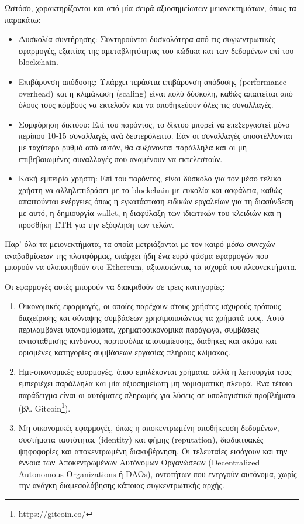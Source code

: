 Ωστόσο, χαρακτηρίζονται και από μία σειρά αξιοσημείωτων μειονεκτημάτων, όπως τα παρακάτω:
\begin{itemize}
	\item Δυσκολία συντήρησης: Συντηρούνται δυσκολότερα από τις συγκεντρωτικές εφαρμογές, εξαιτίας της αμεταβλητότητας του κώδικα και των δεδομένων επί του blockchain. 
	\item Επιβάρυνση απόδοσης: Υπάρχει τεράστια επιβάρυνση απόδοσης (performance overhead) και η κλιμάκωση (scaling) είναι πολύ δύσκολη, καθώς απαιτείται από όλους τους κόμβους να εκτελούν και να αποθηκεύουν όλες τις συναλλαγές.
	\item Συμφόρηση δικτύου: Επί του παρόντος, το δίκτυο μπορεί να επεξεργαστεί μόνο περίπου 10-15 συναλλαγές ανά δευτερόλεπτο. Εάν οι συναλλαγές αποστέλλονται με ταχύτερο ρυθμό από αυτόν, θα αυξάνονται παράλληλα και οι μη επιβεβαιωμένες συναλλαγές που αναμένουν να εκτελεστούν.
	\item Κακή εμπειρία χρήστη: Επί του παρόντος, είναι δύσκολο για τον μέσο τελικό χρήστη να αλληλεπιδράσει με το blockchain με ευκολία και ασφάλεια, καθώς απαιτούνται ενέργειες όπως η εγκατάσταση ειδικών εργαλείων για τη διασύνδεση με αυτό, η δημιουργία wallet, η διαφύλαξη των ιδιωτικών του κλειδιών και η προσθήκη ETH για την εξόφληση των τελών.
\end{itemize}

Παρ' όλα τα μειονεκτήματα, τα οποία μετριάζονται με τον καιρό μέσω συνεχών αναβαθμίσεων της πλατφόρμας, υπάρχει ήδη ένα ευρύ φάσμα εφαρμογών που μπορούν να υλοποιηθούν στο Ethereum, αξιοποιώντας τα ισχυρά του πλεονεκτήματα.

\newpage
Οι εφαρμογές αυτές μπορούν να διακριθούν σε τρεις κατηγορίες:

\begin{enumerate}
	\item Οικονομικές εφαρμογές, οι οποίες παρέχουν στους χρήστες ισχυρούς τρόπους διαχείρισης και σύναψης συμβάσεων χρησιμοποιώντας τα χρήματά τους. Αυτό περιλαμβάνει υπονομίσματα, χρηματοοικονομικά παράγωγα, συμβάσεις αντιστάθμισης κινδύνου, πορτοφόλια αποταμίευσης, διαθήκες και ακόμα και ορισμένες κατηγορίες συμβάσεων εργασίας πλήρους κλίμακας.
	
	\item Ημι-οικονομικές εφαρμογές, όπου εμπλέκονται χρήματα, αλλά η λειτουργία τους εμπεριέχει παράλληλα και μία αξιοσημείωτη μη νομισματική πλευρά. Ένα τέτοιο παράδειγμα είναι οι αυτόματες πληρωμές για λύσεις σε υπολογιστικά προβλήματα (βλ. Gitcoin\footnote{\url{https://gitcoin.co/}}).
	
	\item Μη οικονομικές εφαρμογές, όπως η αποκεντρωμένη αποθήκευση δεδομένων, συστήματα ταυτότητας (identity) και φήμης (reputation), διαδικτυακές ψηφοφορίες και αποκεντρωμένη διακυβέρνηση. Οι τελευταίες εισάγουν και την έννοια των Αποκεντρωμένων Αυτόνομων Οργανώσεων (Decentralized Autonomous Organizations ή DAOs), οντοτήτων που ενεργούν αυτόνομα, χωρίς την ανάγκη διαμεσολάβησης κάποιας συγκεντρωτικής αρχής.\cite{2.6-ethereum-whitepaper}
\end{enumerate}


